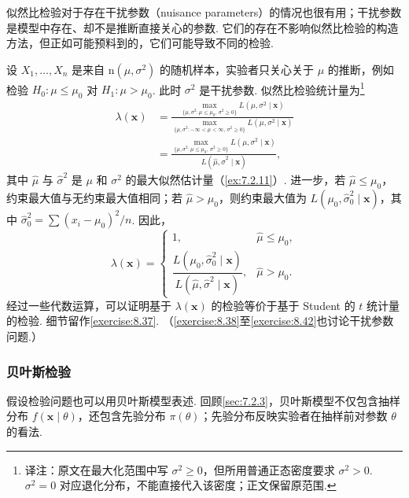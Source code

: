 似然比检验对于存在干扰参数（nuisance parameters）的情况也很有用；干扰参数是模型中存在、却不是推断直接关心的参数. 它们的存在不影响似然比检验的构造方法，但正如可能预料到的，它们可能导致不同的检验.
\begin{example}[方差未知时正态总体的似然比检验]\label{ex:8.2.6}
设 $X_1,\ldots,X_n$ 是来自 $\mathrm n(\mu,\sigma^2)$ 的随机样本，实验者只关心关于 $\mu$ 的推断，例如检验 $H_0:\mu\le\mu_0$ 对 $H_1:\mu>\mu_0$. 此时 $\sigma^2$ 是干扰参数. 似然比检验统计量为\footnote{译注：原文在最大化范围中写 $\sigma^2\ge0$，但所用普通正态密度要求 $\sigma^2>0$. $\sigma^2=0$ 对应退化分布，不能直接代入该密度；正文保留原范围.}
$$\begin{aligned}
\lambda(\boldsymbol x)&=\frac{\max_{\{\mu,\sigma^2:\mu\le\mu_0,\,\sigma^2\ge0\}}L(\mu,\sigma^2\mid\boldsymbol x)}{\max_{\{\mu,\sigma^2:-\infty<\mu<\infty,\,\sigma^2\ge0\}}L(\mu,\sigma^2\mid\boldsymbol x)}\\
&=\frac{\max_{\{\mu,\sigma^2:\mu\le\mu_0,\,\sigma^2\ge0\}}L(\mu,\sigma^2\mid\boldsymbol x)}{L(\hat\mu,\hat\sigma^2\mid\boldsymbol x)},
\end{aligned}$$
其中 $\hat\mu$ 与 $\hat\sigma^2$ 是 $\mu$ 和 $\sigma^2$ 的最大似然估计量（\autoref{ex:7.2.11}\mbox{）.} 进一步，若 $\hat\mu\le\mu_0$，约束最大值与无约束最大值相同；若 $\hat\mu>\mu_0$，则约束最大值为 $L(\mu_0,\hat\sigma_0^2\mid\boldsymbol x)$，其中 $\hat\sigma_0^2=\sum(x_i-\mu_0)^2/n$. 因此，
$$\lambda(\boldsymbol x)=\begin{cases}1,&\hat\mu\le\mu_0,\\\dfrac{L(\mu_0,\hat\sigma_0^2\mid\boldsymbol x)}{L(\hat\mu,\hat\sigma^2\mid\boldsymbol x)},&\hat\mu>\mu_0.\end{cases}$$
经过一些代数运算，可以证明基于 $\lambda(\boldsymbol x)$ 的检验等价于基于 Student 的 $t$ 统计量的检验. 细节留作\autoref{exercise:8.37}. （\autoref{exercise:8.38}至\autoref{exercise:8.42}也讨论干扰参数问题.）
\end{example}

\subsubsection{贝叶斯检验}\label{sec:8.2.2}
假设检验问题也可以用贝叶斯模型表述. 回顾\autoref{sec:7.2.3}，贝叶斯模型不仅包含抽样分布 $f(\boldsymbol x\mid\theta)$，还包含先验分布 $\pi(\theta)$；先验分布反映实验者在抽样前对参数 $\theta$ 的看法.

